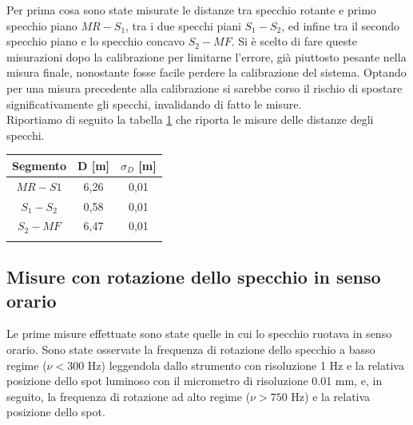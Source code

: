 \documentclass{article}
\begin{document}
            Per prima cosa sono state misurate le distanze tra specchio rotante e primo specchio piano $MR-S_1$, tra i due specchi piani $S_1-S_2$, 
            ed infine tra il secondo specchio piano e lo specchio concavo $S_2-MF$. 
            Si è scelto di fare queste misurazioni dopo la calibrazione per limitarne l'errore, già piuttosto pesante nella misura finale, 
            nonostante fosse facile perdere la calibrazione del sistema. Optando per una misura precedente alla calibrazione si sarebbe corso il rischio di 
            spostare significativamente gli specchi, invalidando di fatto le misure. \\
            
            Riportiamo di seguito la tabella \ref{tabular:distanze} che riporta le misure delle distanze degli specchi. \\

            \begin{table}[H]

                \centering

                \begin{tabular}{ c c c } 
                        
                    \toprule
                    \textbf{Segmento} & D [m] & $\sigma_D$ [m] \\ 

                    \midrule
                        $MR-S1$     &   6,26    & 0,01  \\ 
                        $S_1-S_2$   &   0,58    & 0,01  \\ 
                        $S_2-MF$    &   6,47    & 0,01  \\ 
                    \bottomrule                

                    \label{tabular:distanze}

                \end{tabular}


            \end{table}
        

        \subsection{Misure con rotazione dello specchio in senso orario}
            
            Le prime misure effettuate sono state quelle in cui lo specchio ruotava in senso orario. 
            Sono state osservate la frequenza di rotazione dello specchio a basso regime ($\nu < 300 $ Hz) leggendola dallo strumento con risoluzione 1 Hz e 
            la relativa posizione dello spot luminoso con il micrometro di risoluzione 0.01 mm, e, in seguito, 
            la frequenza di rotazione ad alto regime ($\nu > 750 $ Hz) e la relativa posizione dello spot. \\
            
\end{document}
